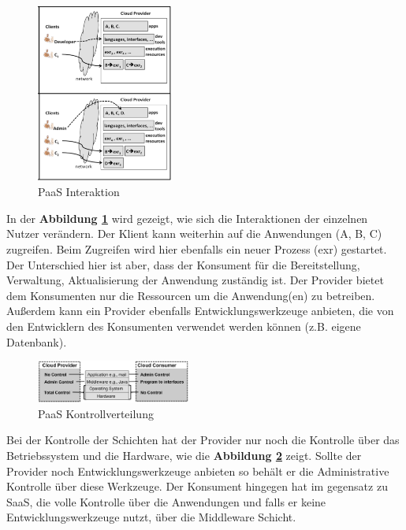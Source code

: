 \begin{figure}[H]
    \centering
	\includegraphics[width=0.4\textwidth]{Images/PaaSInteraction}
	\caption{PaaS Interaktion \cite{Badger}}
	\label{PaaSInteration}
\end{figure}

In der \textbf{Abbildung \ref{PaaSInteration}} wird gezeigt, wie sich die Interaktionen der einzelnen Nutzer verändern.
Der Klient kann weiterhin auf die Anwendungen (A, B, C) zugreifen. Beim Zugreifen wird hier ebenfalls ein neuer Prozess (exr) gestartet. Der Unterschied hier ist aber, dass
der Konsument für die Bereitstellung, Verwaltung, Aktualisierung der Anwendung zuständig ist. Der Provider bietet dem Konsumenten nur die Ressourcen um die Anwendung(en) zu betreiben.
Außerdem kann ein Provider ebenfalls Entwicklungswerkzeuge anbieten, die von den Entwicklern des Konsumenten verwendet werden können (z.B. eigene Datenbank).


\begin{figure}[H]
    \centering
	\includegraphics[width=0.45\textwidth]{Images/PaaSControl}
	\caption{PaaS Kontrollverteilung \cite{Badger}}
	\label{PaaSControl}
\end{figure}

Bei der Kontrolle der Schichten hat der Provider nur noch die Kontrolle über das Betriebssystem und die Hardware, wie die \textbf{Abbildung \ref{PaaSControl}} zeigt.
Sollte der Provider noch Entwicklungswerkzeuge anbieten so behält er die Administrative Kontrolle über diese Werkzeuge. Der Konsument hingegen hat im gegensatz zu SaaS,
die volle Kontrolle über die Anwendungen und falls er keine Entwicklungswerkzeuge nutzt, über die Middleware Schicht.

